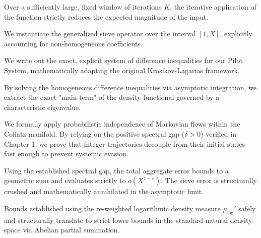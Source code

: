 \begin{theorem}
\leanok
Over a sufficiently large, fixed window of iterations $K$, the iterative application of the function strictly reduces the expected magnitude of the input.
\end{theorem}

\begin{lemma}
\leanok
We instantiate the generalized sieve operator over the interval $[1, X]$, explicitly accounting for non-homogeneous coefficients.
\end{lemma}

\begin{lemma}
\leanok
We write out the exact, explicit system of difference inequalities for our Pilot System, mathematically adapting the original Krasikov-Lagarias framework.
\end{lemma}

\begin{theorem}
\leanok
By solving the homogeneous difference inequalities via asymptotic integration, we extract the exact "main term" of the density functional governed by a characteristic eigenvalue.
\end{theorem}

\begin{lemma}
\leanok
We formally apply probabilistic independence of Markovian flows within the Collatz manifold. By relying on the positive spectral gap ($\delta > 0$) verified in Chapter 1, we prove that integer trajectories decouple from their initial states fast enough to prevent systemic evasion.
\end{lemma}

\begin{theorem}
\leanok
Using the established spectral gap, the total aggregate error bounds to a geometric sum and evaluates strictly to $o(X^{1 - \varepsilon})$. The sieve error is structurally crushed and mathematically annihilated in the asymptotic limit.
\end{theorem}

\begin{lemma}
\leanok
Bounds established using the re-weighted logarithmic density measure $\mu_{\log}'$ safely and structurally translate to strict lower bounds in the standard natural density space via Abelian partial summation.
\end{lemma}

